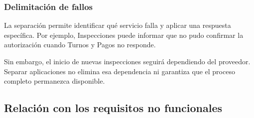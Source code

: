 \documentclass[11pt,a4paper]{article}
\begin{document}
\subsubsection{Delimitación de fallos}

La separación permite identificar qué servicio falla y aplicar una respuesta específica. Por ejemplo, Inspecciones puede informar que no pudo confirmar la autorización cuando Turnos y Pagos no responde.

Sin embargo, el inicio de nuevas inspecciones seguirá dependiendo del proveedor. Separar aplicaciones no elimina esa dependencia ni garantiza que el proceso completo permanezca disponible.

\subsection{Relación con los requisitos no funcionales}
\end{document}
